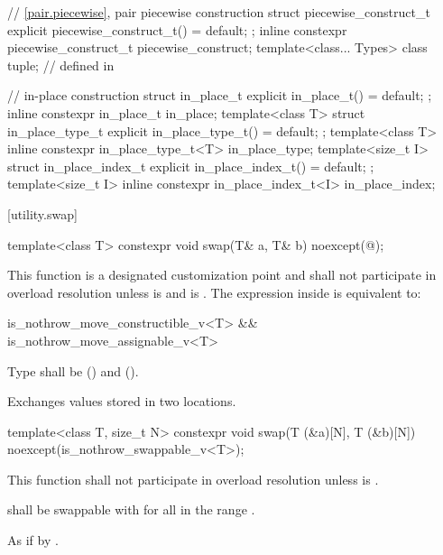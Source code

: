 \begin{codeblock}
{  // \ref{pair.piecewise}, pair piecewise construction
  struct piecewise_construct_t {
    explicit piecewise_construct_t() = default;
  };
  inline constexpr piecewise_construct_t piecewise_construct{};
  template<class... Types> class tuple;        // defined in 

  // in-place construction
  struct in_place_t {
    explicit in_place_t() = default;
  };
  inline constexpr in_place_t in_place{};
  template<class T>
    struct in_place_type_t {
      explicit in_place_type_t() = default;
    };
  template<class T> inline constexpr in_place_type_t<T> in_place_type{};
  template<size_t I>
    struct in_place_index_t {
      explicit in_place_index_t() = default;
    };
  template<size_t I> inline constexpr in_place_index_t<I> in_place_index{};
}
\end{codeblock}

[utility.swap]{}

%
\begin{itemdecl}
template<class T>
  constexpr void swap(T& a, T& b) noexcept(@\seebelow@);
\end{itemdecl}

\begin{itemdescr}
\pnum
\remarks This function
is a designated customization point and
shall not participate in overload resolution
unless  is  and
 is .
The expression inside  is equivalent to:

\begin{codeblock}
is_nothrow_move_constructible_v<T> && is_nothrow_move_assignable_v<T>
\end{codeblock}

\pnum
\requires
Type
shall be
 ()
and
 ().

\pnum
\effects
Exchanges values stored in two locations.
\end{itemdescr}

%
\begin{itemdecl}
template<class T, size_t N>
  constexpr void swap(T (&a)[N], T (&b)[N]) noexcept(is_nothrow_swappable_v<T>);
\end{itemdecl}

\begin{itemdescr}
\pnum
\remarks
This function shall not participate in overload resolution
unless  is .

\pnum
\requires
{} shall be swappable with 
for all  in the range .

\pnum
\effects As if by .
\end{itemdescr}

